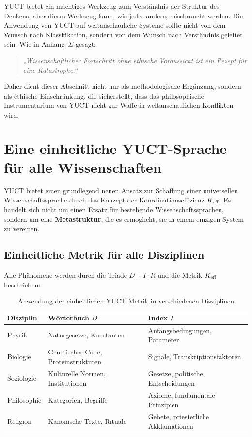\documentclass[12pt,a4paper]{article}
\begin{document}
	YUCT bietet ein mächtiges Werkzeug zum Verständnis der Struktur des Denkens, aber dieses Werkzeug kann, wie jedes andere, missbraucht werden. Die Anwendung von YUCT auf weltanschauliche Systeme sollte nicht von dem Wunsch nach Klassifikation, sondern von dem Wunsch nach Verständnis geleitet sein. Wie in Anhang~$\Sigma$ gesagt:
	
	\begin{quote}
		\itshape
		„Wissenschaftlicher Fortschritt ohne ethische Voraussicht ist ein Rezept für eine Katastrophe.“
	\end{quote}
	
	Daher dient dieser Abschnitt nicht nur als methodologische Ergänzung, sondern als ethische Einschränkung, die sicherstellt, dass das philosophische Instrumentarium von YUCT nicht zur Waffe in weltanschaulichen Konflikten wird.
	
	
	\section{Eine einheitliche YUCT-Sprache für alle Wissenschaften}
	
	YUCT bietet einen grundlegend neuen Ansatz zur Schaffung einer universellen Wissenschaftssprache durch das Konzept der Koordinationseffizienz \(\Keff\). Es handelt sich nicht um einen Ersatz für bestehende Wissenschaftssprachen, sondern um eine \textbf{Metastruktur}, die es ermöglicht, sie in einem einzigen System zu vereinen.
	
	\subsection{Einheitliche Metrik für alle Disziplinen}
	
	Alle Phänomene werden durch die Triade \(D + I \cdot R\) und die Metrik \(\Keff\) beschrieben:
	
	\begin{table}[H]
		\centering
		\caption{Anwendung der einheitlichen YUCT-Metrik in verschiedenen Disziplinen}
		\label{tab:unified-metrics}
		\begin{tabular}{p{3.5cm}p{4.5cm}p{4.5cm}}
			\toprule
			\textbf{Disziplin} & \textbf{Wörterbuch \(D\)} & \textbf{Index \(I\)} \\
			\midrule
			Physik & Naturgesetze, Konstanten & Anfangsbedingungen, Parameter \\
			Biologie & Genetischer Code, Proteinstrukturen & Signale, Transkriptionsfaktoren \\
			Soziologie & Kulturelle Normen, Institutionen & Gesetze, politische Entscheidungen \\
			Philosophie & Kategorien, Begriffe & Axiome, fundamentale Prinzipien \\
			Religion & Kanonische Texte, Rituale & Gebete, priesterliche Akklamationen \\
			\bottomrule
		\end{tabular}
	\end{table}
	
\end{document}
